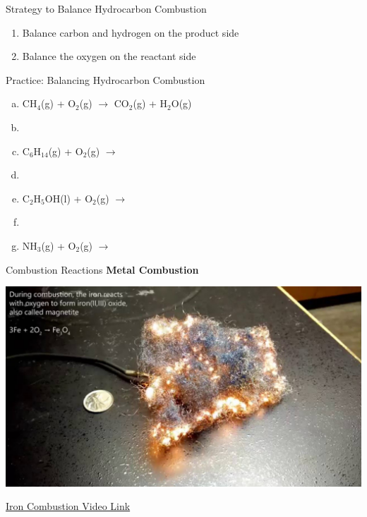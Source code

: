 \documentclass[11pt]{beamer}
\begin{document}
\begin{frame}{Strategy to Balance Hydrocarbon Combustion}
  \begin{enumerate}
  \item Balance carbon and hydrogen on the product side
  \item Balance the oxygen on the reactant side
  \end{enumerate}
\end{frame}

\begin{frame}{Practice: Balancing Hydrocarbon Combustion}
  \begin{enumerate}[(a)]
  \item CH$_4$(g) + O$_2$(g) $\rightarrow$
    CO$_2$(g) + H$_2$O(g)
  \item[]
  \item C$_6$H$_14$(g) + O$_2$(g) $\rightarrow$
  \item[]
  \item C$_{2}$H$_{5}$OH(l) + O$_2$(g) $\rightarrow$
  \item[]
  \item NH$_3$(g) + O$_2$(g) $\rightarrow$
  \end{enumerate}
\end{frame}

\begin{frame}{Combustion Reactions}
  \textbf{Metal Combustion}
  \begin{center}
    \includegraphics[scale=0.17]{metal_combust}
  \end{center}
  \href{https://www.youtube.com/watch?v=Z2llRM6UYlU}{Iron Combustion Video Link}
\end{frame}
\end{document}
